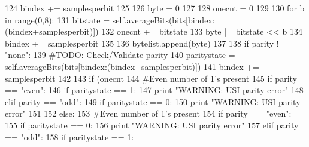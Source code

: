 \begin{DoxyCode}
{124                     bindex += samplesperbit
125                 
126                 byte = 0
127                 
128                 onecnt = 0
129         
130                 \textcolor{keywordflow}{for} b \textcolor{keywordflow}{in} range(0,8):
131                     bitstate = self.\hyperlink{classsoftware_1_1chipwhisperer_1_1capture_1_1scopes_1_1cwhardware_1_1ChipWhispererTargets_1_1CWUniversalSerialProcessor_a6c440a6340a95a9c8a76e99795c412f4}{averageBits}(bits[bindex:(bindex+samplesperbit)])
132                     onecnt += bitstate
133                     byte |= bitstate << b
134                     bindex += samplesperbit
135                     
136                 bytelist.append(byte)
137                 
138                 \textcolor{keywordflow}{if} parity != \textcolor{stringliteral}{"none"}:
139                     \textcolor{comment}{#TODO: Check/Validate parity}
140                     paritystate = self.\hyperlink{classsoftware_1_1chipwhisperer_1_1capture_1_1scopes_1_1cwhardware_1_1ChipWhispererTargets_1_1CWUniversalSerialProcessor_a6c440a6340a95a9c8a76e99795c412f4}{averageBits}(bits[bindex:(bindex+samplesperbit)])
141                     bindex += samplesperbit
142                     
143                     \textcolor{keywordflow}{if} (onecnt %
144                         \textcolor{comment}{#Even number of 1's present}
145                         \textcolor{keywordflow}{if} parity == \textcolor{stringliteral}{"even"}:
146                             \textcolor{keywordflow}{if} paritystate == 1:
147                                 \textcolor{keywordflow}{print} \textcolor{stringliteral}{"WARNING: USI parity error"}
148                         \textcolor{keywordflow}{elif} parity == \textcolor{stringliteral}{"odd"}:
149                             \textcolor{keywordflow}{if} paritystate == 0:
150                                 \textcolor{keywordflow}{print} \textcolor{stringliteral}{"WARNING: USI parity error"}
151                      
152                     \textcolor{keywordflow}{else}:
153                         \textcolor{comment}{#Even number of 1's present}
154                         \textcolor{keywordflow}{if} parity == \textcolor{stringliteral}{"even"}:
155                             \textcolor{keywordflow}{if} paritystate == 0:
156                                 \textcolor{keywordflow}{print} \textcolor{stringliteral}{"WARNING: USI parity error"}
157                         \textcolor{keywordflow}{elif} parity == \textcolor{stringliteral}{"odd"}:
158                             \textcolor{keywordflow}{if} paritystate == 1:
}
\end{DoxyCode}
